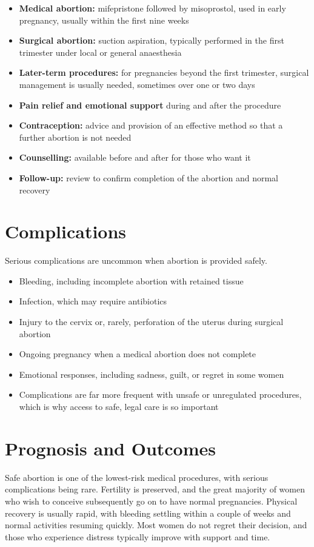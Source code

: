 \begin{itemize}
    \item \textbf{Medical abortion:} mifepristone followed by misoprostol, used in early pregnancy, usually within the first nine weeks
    \item \textbf{Surgical abortion:} suction aspiration, typically performed in the first trimester under local or general anaesthesia
    \item \textbf{Later-term procedures:} for pregnancies beyond the first trimester, surgical management is usually needed, sometimes over one or two days
    \item \textbf{Pain relief and emotional support} during and after the procedure
    \item \textbf{Contraception:} advice and provision of an effective method so that a further abortion is not needed
    \item \textbf{Counselling:} available before and after for those who want it
    \item \textbf{Follow-up:} review to confirm completion of the abortion and normal recovery
\end{itemize}

\section*{Complications}
Serious complications are uncommon when abortion is provided safely.

\begin{itemize}
    \item Bleeding, including incomplete abortion with retained tissue
    \item Infection, which may require antibiotics
    \item Injury to the cervix or, rarely, perforation of the uterus during surgical abortion
    \item Ongoing pregnancy when a medical abortion does not complete
    \item Emotional responses, including sadness, guilt, or regret in some women
    \item Complications are far more frequent with unsafe or unregulated procedures, which is why access to safe, legal care is so important
\end{itemize}

\section*{Prognosis and Outcomes}
Safe abortion is one of the lowest-risk medical procedures, with serious complications being rare. Fertility is preserved, and the great majority of women who wish to conceive subsequently go on to have normal pregnancies. Physical recovery is usually rapid, with bleeding settling within a couple of weeks and normal activities resuming quickly. Most women do not regret their decision, and those who experience distress typically improve with support and time.

